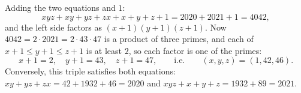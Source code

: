 Adding the two equations and $1$:
\[xyz+xy+yz+zx+x+y+z+1=2020+2021+1=4042,\]
and the left side factors as $(x+1)(y+1)(z+1)$. Now $4042=2\cdot2021=2\cdot43\cdot47$ is a product of three primes, and each of $x+1\le y+1\le z+1$ is at least $2$, so each factor is one of the primes:
\[x+1=2,\quad y+1=43,\quad z+1=47,\qquad\text{i.e.}\qquad(x,y,z)=\boxed{(1,42,46)}.\]
Conversely, this triple satisfies both equations: $xy+yz+zx=42+1932+46=2020$ and $xyz+x+y+z=1932+89=2021$.
